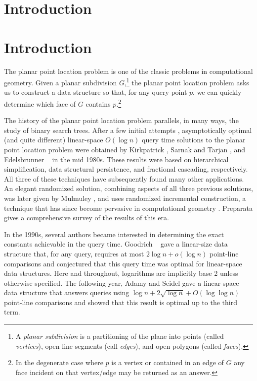 \documentclass[lotsofwhite]{patmorin}
\begin{document}
\section{Introduction}


\section{Introduction}

The planar point location problem is one of the classic problems in
computational geometry. Given a planar subdivision $G$,\footnote{A
\emph{planar subdivision} is a partitioning of the plane into points
(called \emph{vertices}), open line segments (call \emph{edges}), and
open polygons (called \emph{faces}).} the planar point location
problem asks us to construct a data structure so that, for any query
point $p$, we can quickly determine which face of $G$ contains
$p$.\footnote{In the degenerate case where $p$ is a vertex or contained
in an edge of $G$ any face incident on that vertex/edge may be
returned as an answer.}

The history of the planar point location problem parallels, in many
ways, the study of binary search trees.  After a few initial attempts
\cite{dl76,lp77,p81}, asymptotically optimal (and quite different)
linear-space $O(\log n)$ query time solutions to the planar point
location problem were obtained by Kirkpatrick \cite{k83}, Sarnak and
Tarjan \cite{st86}, and Edelsbrunner \etal\ \cite{egs86} in the mid
1980s.  These results were based on hierarchical simplification, data
structural persistence, and fractional cascading, respectively.  All
three of these techniques have subsequently found many other
applications.  An elegant randomized solution, combining aspects of
all three previous solutions, was later given by Mulmuley \cite{m90},
and uses randomized incremental construction, a technique that has
since become pervasive in computational geometry
\cite[Section~9.5]{bcko08}.  Preparata \cite{p90} gives a
comprehensive survey of the results of this era.

In the 1990s, several authors became interested in determining the
exact constants achievable in the query time.  Goodrich \etal\
\cite{gor97} gave a linear-size data structure that, for any query,
requires at most $2\log n + o(\log n)$ point-line comparisons and
conjectured that this query time was optimal for linear-space data
structures. Here and throughout, logarithms are implicitly base 2
unless otherwise specified. The following year, Adamy and Seidel
\cite{as98} gave a linear-space data structure that answers queries
using $\log n + 2\sqrt{\log n} + O(\log\log n)$ point-line comparisons
and showed that this result is optimal up to the third term.
\end{document}
